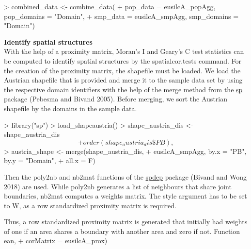 \begin{example}
\textgreater{} combined\_data \textless- combine\_data( + pop\_data = eusilcA\_popAgg,
pop\_domains = "Domain", + smp\_data = eusilcA\_smpAgg, smp\_domains =
"Domain")
\end{example}

\textbf{Identify spatial structures}\\
With the help of a proximity matrix, Moran's I and Geary's C test
statistics can be computed to identify spatial structures by the
spatialcor.tests command. For the creation of the proximity matrix, the
shapefile must be loaded. We load the Austrian shapefile that is
provided and merge it to the sample data set by using the respective
domain identifiers with the help of the merge method from the
\href{https://CRAN.R-project.org/package=sp}{sp} package (Pebesma and Bivand 2005).
Before merging, we sort the Austrian shapefile by the domains in the
sample data.

\begin{example}
\textgreater{} library("sp") \textgreater{} load\_shapeaustria() \textgreater{} shape\_austria\_dis \textless-
shape\_austria\_dis\[ + order(shape_austria_dis\$PB),\] \textgreater{} austria\_shape
\textless- merge(shape\_austria\_dis, + eusilcA\_smpAgg, by.x = "PB", by.y =
"Domain", + all.x = F)
\end{example}

Then the poly2nb and nb2mat functions of the
\href{https://CRAN.R-project.org/package=spdep}{spdep} package (Bivand and Wong 2018)
are used. While poly2nb generates a list of neighbours that share joint
boundaries, nb2mat computes a weights matrix. The style argument has to
be set to W, as a row standardized proximity matrix is required.

  Thus, a row standardized proximity matrix is generated that initially had weights of one if an area shares a boundary with another area and zero if not. Function \texorpdfstring%
\)Mean, + corMatrix =
eusilcA\_prox)

